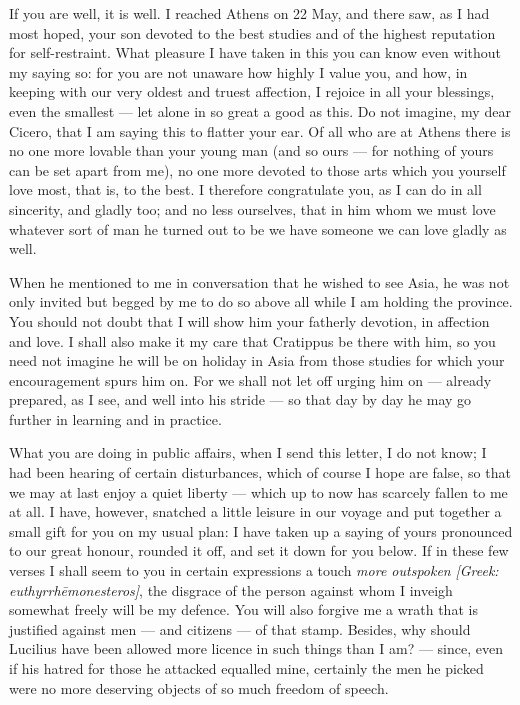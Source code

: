 

 If you are well, it is well. I reached Athens on 22 May, and there saw, as I had most hoped, your son devoted to the best studies and of the highest reputation for self-restraint. What pleasure I have taken in this you can know even without my saying so: for you are not unaware how highly I value you, and how, in keeping with our very oldest and truest affection, I rejoice in all your blessings, even the smallest --- let alone in so great a good as this. Do not imagine, my dear Cicero, that I am saying this to flatter your ear. Of all who are at Athens there is no one more lovable than your young man (and so ours --- for nothing of yours can be set apart from me), no one more devoted to those arts which you yourself love most, that is, to the best. I therefore congratulate you, as I can do in all sincerity, and gladly too; and no less ourselves, that in him whom we must love whatever sort of man he turned out to be we have someone we can love gladly as well.

 When he mentioned to me in conversation that he wished to see Asia, he was not only invited but begged by me to do so above all while I am holding the province. You should not doubt that I will show him your fatherly devotion, in affection and love. I shall also make it my care that Cratippus be there with him, so you need not imagine he will be on holiday in Asia from those studies for which your encouragement spurs him on. For we shall not let off urging him on --- already prepared, as I see, and well into his stride --- so that day by day he may go further in learning and in practice.

 What you are doing in public affairs, when I send this letter, I do not know; I had been hearing of certain disturbances, which of course I hope are false, so that we may at last enjoy a quiet liberty --- which up to now has scarcely fallen to me at all. I have, however, snatched a little leisure in our voyage and put together a small gift for you on my usual plan: I have taken up a saying of yours pronounced to our great honour, rounded it off, and set it down for you below. If in these few verses I shall seem to you in certain expressions a touch \textit{more outspoken} \textit{[Greek: euthyrrh\=emonesteros]}, the disgrace of the person against whom I inveigh somewhat freely will be my defence. You will also forgive me a wrath that is justified against men --- and citizens --- of that stamp. Besides, why should Lucilius have been allowed more licence in such things than I am? --- since, even if his hatred for those he attacked equalled mine, certainly the men he picked were no more deserving objects of so much freedom of speech.

